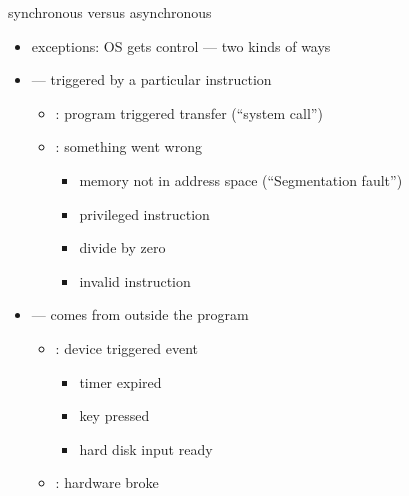 \begin{frame}{synchronous versus asynchronous}
\begin{itemize}
\item exceptions: OS gets control --- two kinds of ways
    \vspace{.5cm}
\item {} --- triggered by a particular instruction
    \begin{itemize}
        \item {}: program triggered transfer (``system call'')
        \item {}: something went wrong 
            \begin{itemize}
            \item memory not in address space (``Segmentation fault'')
            \item privileged instruction
            \item divide by zero
            \item invalid instruction
            \end{itemize}
    \end{itemize}
\item {} --- comes from outside the program
    \begin{itemize}
    \item {}: device triggered event
        \begin{itemize}
        \item timer expired
        \item key pressed
        \item hard disk input ready
        \end{itemize}
    \item {}: hardware broke
    \end{itemize}
\end{itemize}
\end{frame}


